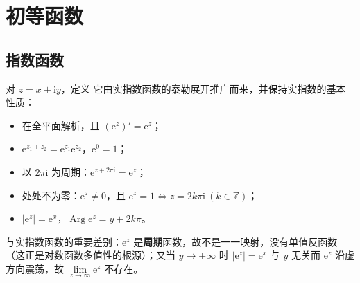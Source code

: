 
\section{初等函数}

\subsection{指数函数}
对 \(z=x+\mathrm{i}y\)，定义
它由实指数函数的泰勒展开推广而来，并保持实指数的基本性质：
\begin{itemize}[leftmargin=2em]
  \item 在全平面解析，且 \((\mathrm{e}^{z})'=\mathrm{e}^{z}\)；
  \item \(\mathrm{e}^{z_{1}+z_{2}}=\mathrm{e}^{z_{1}}\mathrm{e}^{z_{2}}\)，\(\mathrm{e}^{0}=1\)；
  \item 以 \(2\pi\mathrm{i}\) 为周期：\(\mathrm{e}^{z+2\pi\mathrm{i}}=\mathrm{e}^{z}\)；
  \item 处处不为零：\(\mathrm{e}^{z}\neq 0\)，且 \(\mathrm{e}^{z}=1\iff z=2k\pi\mathrm{i}\ (k\in\mathbb{Z})\)；
  \item \(|\mathrm{e}^{z}|=\mathrm{e}^{x}\)，\(\operatorname{Arg}\mathrm{e}^{z}=y+2k\pi\)。
\end{itemize}
与实指数函数的重要差别：\(\mathrm{e}^{z}\) 是\textbf{周期}函数，故不是一一映射，没有单值反函数（这正是对数函数多值性的根源）；又当 \(y\to\pm\infty\) 时 \(|\mathrm{e}^{z}|=\mathrm{e}^{x}\) 与 \(y\) 无关而 \(\mathrm{e}^{z}\) 沿虚方向震荡，故 \(\lim\limits_{z\to\infty}\mathrm{e}^{z}\) 不存在。


